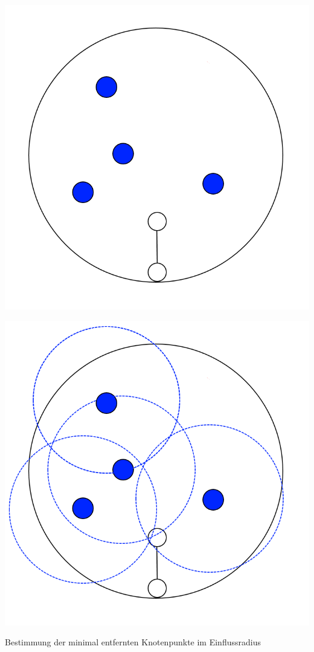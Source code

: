 \begin{center}
	\includegraphics[height=.9\textheight]{images/CH3_SCA_Basic1.png}
\end{center}




\newpage
\begin{center}
	\includegraphics[height=.9\textheight]{images/CH3_SCA_Basic2.png}
	
	Bestimmung der minimal entfernten Knotenpunkte im Einflussradius
\end{center}





